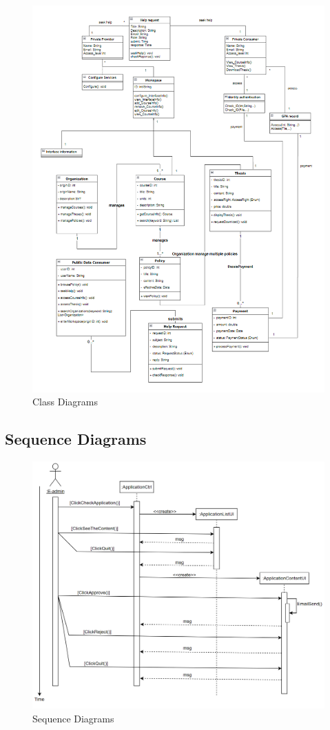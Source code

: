 \begin{figure}[H]
    \centering
    \includegraphics[width=0.75\linewidth]{picture/20250318214546.png}
    \caption{Class Diagrams}
    \label{fig:enter-label}
\end{figure}

\subsection{Sequence Diagrams}
\begin{figure}[H]
    \centering
    \includegraphics[width=0.75\linewidth]{picture/WechatIMG551.jpg}
    \caption{Sequence Diagrams}
    \label{fig:enter-label}
\end{figure}


